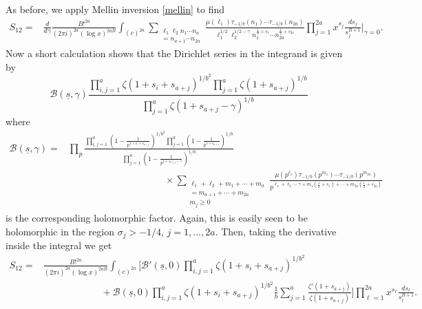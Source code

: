 \documentclass[oneside, 12pt]{amsart}
\theoremstyle{definition}
\newcommand{\mc}{\mathcal}
\newcommand{\ul}{\underline}
\begin{document}
As before, we apply Mellin inversion \eqref{mellin} to find
\begin{align*}
S_{12} =
&\frac{d}{d\gamma} \frac{B!^{2a}}{(2\pi i )^{2a}(\log x)^{2aB}}\int_{(c)^{2a}} 
 \sum_{\substack{\ell_1\ell_2 n_1\cdots n_a\\=n_{a+1}\cdots n_{2a}}} 
 \frac{ \mu(\ell_1)\tau_{-1/b}(n_1) \cdots \tau_{-1/b}(n_{2a}) }{ \ell_1^{1/2}\ell_2^{1/2-\gamma}n_1^{\frac{1}{2}+s_1} \cdots n_{2a}^{\frac{1}{2}+s_{2a}} }  
 \prod_{j=1}^{2a}x^{s_j}\frac{ds_j}{s_j^{B+1}} \bigg|_{\gamma=0}.
\end{align*}
Now a short calculation shows that the Dirichlet series in the integrand is given by 
\[
\mc{B}(\ul s,\gamma)\frac{ \prod_{i,j=1}^a \zeta(1+s_i+s_{a+j})^{1/b^2}\prod_{j=1}^a \zeta(1+s_{a+j})^{1/b} }{ \prod_{j=1}^a \zeta(1+s_{a+j}-\gamma)^{1/b} }
\]
where 
\begin{align*}
\mc{B}(\ul s, \gamma) = &\prod_p\frac{\prod_{i,j=1}^a\left( 1 - \frac{ 1 }{ p^{1+s_i+s_{a+j}} } \right)^{1/b^2}\prod_{j=1}^a\left( 1 - \frac{ 1 }{ p^{1+s_{a+j}} } \right)^{1/b} }{\prod_{j=1}^a\left( 1 - \frac{ 1 }{ p^{1+s_{a+j}-\gamma} } \right)^{1/b} }\\
                               &\qquad\qquad\qquad\qquad\qquad \times\sum_{ \substack{ \ell_1+\ell_2+m_1+\cdots+m_a\\= m_{a+1}+\cdots+m_{2a}\\m_j\geqslant 0 } } \frac{ \mu(p^{\ell_1})\tau_{-1/b}(p^{m_1})\cdots \tau_{-1/b}(p^{m_{2a}}) }{ p^{ \ell_1+\ell_2-\gamma+m_1(\frac{1}{2}+s_1 )+\cdots+m_{2a}( \frac{1}{2}+s_{2a} ) } }
\end{align*}
is the corresponding holomorphic factor. Again, this is easily seen to be holomorphic in the region $\sigma_j>-1/4$, $j=1,\ldots, 2a$. Then, taking the derivative inside the integral we get 
\begin{align*}
S_{12} = & \frac{B!^{2a}}{(2\pi i)^{2a}(\log x)^{2aB}}\int_{(c)^{2a}}
 \bigg[\mc{B}'(\ul{s},0)\prod_{i,j=1}^a \zeta(1+s_i+s_{a+j})^{1/b^2} \\
               &\qquad\qquad\qquad + \mc{B}(\ul s,0)\prod_{i,j=1}^a \zeta(1+s_i+s_{a+j})^{1/b^2}\frac{1}{b} \sum_{j=1}^a \frac{ \zeta'(1+s_{a+j}) }{ \zeta(1+s_{a+j}) }  
               \bigg]
                \prod_{\ell=1}^{2a}x^{s_\ell}\frac{ds_\ell}{s_\ell^{B+1}}.
\end{align*}
\end{document}
